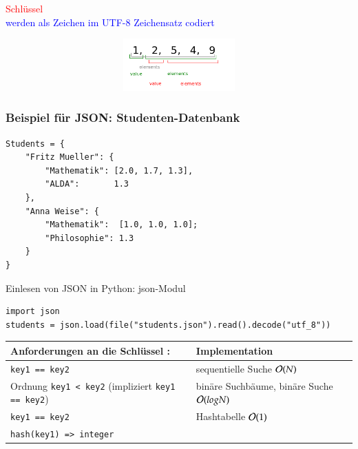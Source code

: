 \textcolor{red}{Schlüssel} \\
\textcolor{blue}{werden als Zeichen im UTF-8 Zeichensatz codiert}

\includegraphics[width=16cm,height=2cm,keepaspectratio]{./Pictures/komischesArray.png}

\subsubsection*{Beispiel für JSON: Studenten-Datenbank}
\begin{verbatim}
Students = {
    "Fritz Mueller": {
        "Mathematik": [2.0, 1.7, 1.3],
        "ALDA":       1.3
    },
    "Anna Weise": {
        "Mathematik":  [1.0, 1.0, 1.0];
        "Philosophie": 1.3
    }
}
\end{verbatim}
Einlesen von JSON in Python: json-Modul

\begin{verbatim}
import json
students = json.load(file("students.json").read().decode("utf_8"))
\end{verbatim}

\vspace*{1cm}

\begin{tabular}{L{8.5cm} | L{7cm}}
    \textbf{Anforderungen an die Schlüssel :} & Implementation \\ \hline
    \verb|key1 == key2| & sequentielle Suche $\mathcal{O}{}(N)$ \\ \hline
    Ordnung \verb|key1 < key2| (impliziert \verb|key1 == key2|) & binäre Suchbäume, binäre Suche $\mathcal{O}{}(log N)$ \\ \hline
    \verb|key1 == key2| & Hashtabelle \hspace*{2cm} $\mathcal{O}{}(1)$ \\
    \verb|hash(key1) => integer| & \\
\end{tabular}

\vspace*{1cm}

